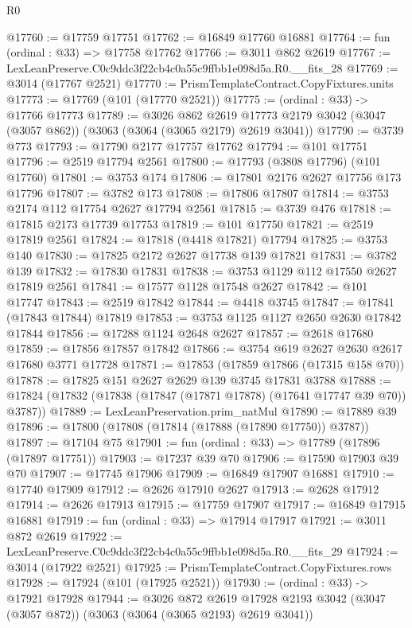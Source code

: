 \begin{lexlean}{R0}
\begin{coremodule}
@17760 := @17759 @17751
@17762 := @16849 @17760 @16881
@17764 := fun (ordinal : @33) => @17758 @17762
@17766 := @3011 @862 @2619
@17767 := LexLeanPreserve.C0c9ddc3f22cb4c0a55c9ffbb1e098d5a.R0.__fits_28
@17769 := @3014 (@17767 @2521)
@17770 := PrismTemplateContract.CopyFixtures.units
@17773 := @17769 (@101 (@17770 @2521))
@17775 := (ordinal : @33) -> @17766 @17773
@17789 := @3026
    @862
    @2619
    @17773
    @2179
    @3042
    (@3047 (@3057 @862))
    (@3063 (@3064 (@3065 @2179) @2619 @3041))
@17790 := @3739 @773
@17793 := @17790 @2177 @17757 @17762
@17794 := @101 @17751
@17796 := @2519 @17794 @2561
@17800 := @17793 (@3808 @17796) (@101 @17760)
@17801 := @3753 @174
@17806 := @17801 @2176 @2627 @17756 @173 @17796
@17807 := @3782 @173
@17808 := @17806 @17807
@17814 := @3753 @2174 @112 @17754 @2627 @17794 @2561
@17815 := @3739 @476
@17818 := @17815 @2173 @17739 @17753
@17819 := @101 @17750
@17821 := @2519 @17819 @2561
@17824 := @17818 (@4418 @17821) @17794
@17825 := @3753 @140
@17830 := @17825 @2172 @2627 @17738 @139 @17821
@17831 := @3782 @139
@17832 := @17830 @17831
@17838 := @3753 @1129 @112 @17550 @2627 @17819 @2561
@17841 := @17577 @1128 @17548 @2627
@17842 := @101 @17747
@17843 := @2519 @17842
@17844 := @4418 @3745
@17847 := @17841 (@17843 @17844) @17819
@17853 := @3753 @1125 @1127 @2650 @2630 @17842 @17844
@17856 := @17288 @1124 @2648 @2627
@17857 := @2618 @17680
@17859 := @17856 @17857 @17842
@17866 := @3754 @619 @2627 @2630 @2617 @17680 @3771 @17728
@17871 := @17853 (@17859 @17866 (@17315 @158 @70))
@17878 := @17825 @151 @2627 @2629 @139 @3745 @17831 @3788
@17888 := @17824 (@17832 (@17838 (@17847 (@17871 @17878) (@17641 @17747 @39 @70)) @3787))
@17889 := LexLeanPreservation.prim_natMul
@17890 := @17889 @39
@17896 := @17800 (@17808 (@17814 (@17888 (@17890 @17750)) @3787))
@17897 := @17104 @75
@17901 := fun (ordinal : @33) => @17789 (@17896 (@17897 @17751))
@17903 := @17237 @39 @70
@17906 := @17590 @17903 @39 @70
@17907 := @17745 @17906
@17909 := @16849 @17907 @16881
@17910 := @17740 @17909
@17912 := @2626 @17910 @2627
@17913 := @2628 @17912
@17914 := @2626 @17913
@17915 := @17759 @17907
@17917 := @16849 @17915 @16881
@17919 := fun (ordinal : @33) => @17914 @17917
@17921 := @3011 @872 @2619
@17922 := LexLeanPreserve.C0c9ddc3f22cb4c0a55c9ffbb1e098d5a.R0.__fits_29
@17924 := @3014 (@17922 @2521)
@17925 := PrismTemplateContract.CopyFixtures.rows
@17928 := @17924 (@101 (@17925 @2521))
@17930 := (ordinal : @33) -> @17921 @17928
@17944 := @3026
    @872
    @2619
    @17928
    @2193
    @3042
    (@3047 (@3057 @872))
    (@3063 (@3064 (@3065 @2193) @2619 @3041))

\end{coremodule}
\end{lexlean}
